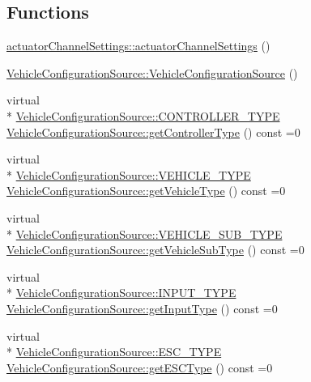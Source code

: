 \subsection*{Functions}
\begin{DoxyCompactItemize}
\item 
\hyperlink{group___vehicle_configuration_source_gafb0dd689dc5216c230c118b385dc1b56}{actuator\-Channel\-Settings\-::actuator\-Channel\-Settings} ()
\item 
\hyperlink{group___vehicle_configuration_source_ga56e48ed960f6d5fd24d03e01caaa460b}{Vehicle\-Configuration\-Source\-::\-Vehicle\-Configuration\-Source} ()
\item 
virtual \\*
\hyperlink{group___vehicle_configuration_source_ga3cfce2b0a501a6fdb7a0ae408ba63556}{Vehicle\-Configuration\-Source\-::\-C\-O\-N\-T\-R\-O\-L\-L\-E\-R\-\_\-\-T\-Y\-P\-E} \hyperlink{group___vehicle_configuration_source_ga7c0552b72e10b1c4f84ffcb926f1bc87}{Vehicle\-Configuration\-Source\-::get\-Controller\-Type} () const =0
\item 
virtual \\*
\hyperlink{group___vehicle_configuration_source_gaa97253587c69ba0d23535abdc42fad43}{Vehicle\-Configuration\-Source\-::\-V\-E\-H\-I\-C\-L\-E\-\_\-\-T\-Y\-P\-E} \hyperlink{group___vehicle_configuration_source_gacfd79047f8c186731eca58056dbb979d}{Vehicle\-Configuration\-Source\-::get\-Vehicle\-Type} () const =0
\item 
virtual \\*
\hyperlink{group___vehicle_configuration_source_gaa22bfa88d750f2b46f66702a723e8342}{Vehicle\-Configuration\-Source\-::\-V\-E\-H\-I\-C\-L\-E\-\_\-\-S\-U\-B\-\_\-\-T\-Y\-P\-E} \hyperlink{group___vehicle_configuration_source_gab3c8f49e774f0b679b21f6f281b3b803}{Vehicle\-Configuration\-Source\-::get\-Vehicle\-Sub\-Type} () const =0
\item 
virtual \\*
\hyperlink{group___vehicle_configuration_source_gae10edd59d3a32fad8c531a1d2346115c}{Vehicle\-Configuration\-Source\-::\-I\-N\-P\-U\-T\-\_\-\-T\-Y\-P\-E} \hyperlink{group___vehicle_configuration_source_gaa63bd09fcc8f30102f720cad79f99e7f}{Vehicle\-Configuration\-Source\-::get\-Input\-Type} () const =0
\item 
virtual \\*
\hyperlink{group___vehicle_configuration_source_ga734c812e17554d4f7ca67f1008abdd6c}{Vehicle\-Configuration\-Source\-::\-E\-S\-C\-\_\-\-T\-Y\-P\-E} \hyperlink{group___vehicle_configuration_source_ga748ecf5409ded5e291f093a48cea7637}{Vehicle\-Configuration\-Source\-::get\-E\-S\-C\-Type} () const =0

\end{DoxyCompactItemize}
